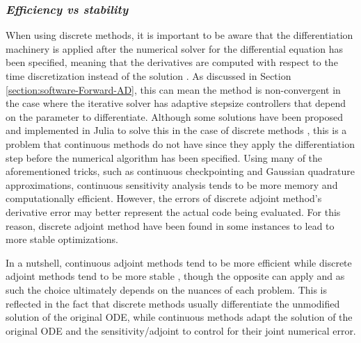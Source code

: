 
\subsubsection*{\textit{Efficiency vs stability}}

When using discrete methods, it is important to be aware that the differentiation machinery is applied after the numerical solver for the differential equation has been specified, meaning that the derivatives are computed with respect to the time discretization instead of the solution \cite{Eberhard_Bischof_1996}.
As discussed in Section \ref{section:software-Forward-AD}, this can mean the method is non-convergent in the case where the iterative solver has adaptive stepsize controllers that depend on the parameter to differentiate.
Although some solutions have been proposed and implemented in Julia to solve this in the case of discrete methods \cite{Eberhard_Bischof_1996}, this is a problem that continuous methods do not have since they apply the differentiation step before the numerical algorithm has been specified. 
Using many of the aforementioned tricks, such as continuous checkpointing and Gaussian quadrature approximations, continuous sensitivity analysis tends to be more memory and computationally efficient. 
However, the errors of discrete adjoint method's derivative error may better represent the actual code being evaluated. 
For this reason, discrete adjoint method have been found in some instances to lead to more stable optimizations. 

In a nutshell, continuous adjoint methods tend to be more efficient while discrete adjoint methods tend to be more stable \cite{rackauckas2020universal}, though the opposite can apply and as such the choice ultimately depends on the nuances of each problem.
This is reflected in the fact that discrete methods usually differentiate the unmodified solution of the original ODE, while continuous methods adapt the solution of the original ODE and the sensitivity/adjoint to control for their joint numerical error. 


